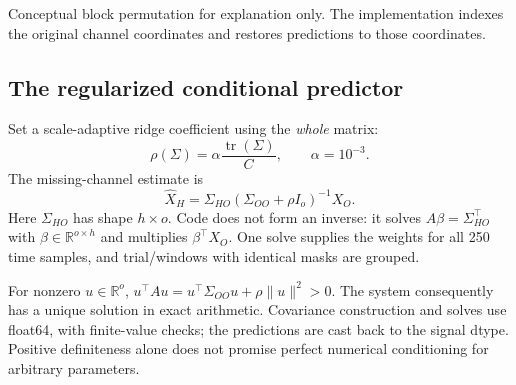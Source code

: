 \documentclass[11pt,a4paper]{article}
\newcommand{\R}{\mathbb R}
\newcommand{\tr}{\operatorname{tr}}
\begin{document}
\begin{center}
\end{center}
{\small Conceptual block permutation for explanation only. The implementation
indexes the original channel coordinates and restores predictions to those coordinates.}

\subsection{The regularized conditional predictor}
Set a scale-adaptive ridge coefficient using the \emph{whole} matrix:
\begin{equation}
 \rho(\Sigma)=\alpha\frac{\tr(\Sigma)}{C},\qquad\alpha=10^{-3}.
 \label{eq:rho}
\end{equation}
The missing-channel estimate is
\begin{equation}
 \boxed{\widehat X_H=\Sigma_{HO}(\Sigma_{OO}+\rho I_o)^{-1}X_O.}
 \label{eq:completion}
\end{equation}
Here $\Sigma_{HO}$ has shape $h\times o$. Code does not form an inverse:
it solves $A\beta=\Sigma_{HO}^{\top}$ with $\beta\in\R^{o\times h}$ and
multiplies $\beta^\top X_O$. One solve supplies the weights for all 250 time
samples, and trial/windows with identical masks are grouped.

For nonzero $u\in\R^o$, $u^\top Au=u^\top\Sigma_{OO}u+\rho\|u\|^2>0$.
The system consequently has a unique solution in exact arithmetic. Covariance
construction and solves use float64, with finite-value checks; the predictions
are cast back to the signal dtype. Positive definiteness alone does not promise
perfect numerical conditioning for arbitrary parameters.
\end{document}

